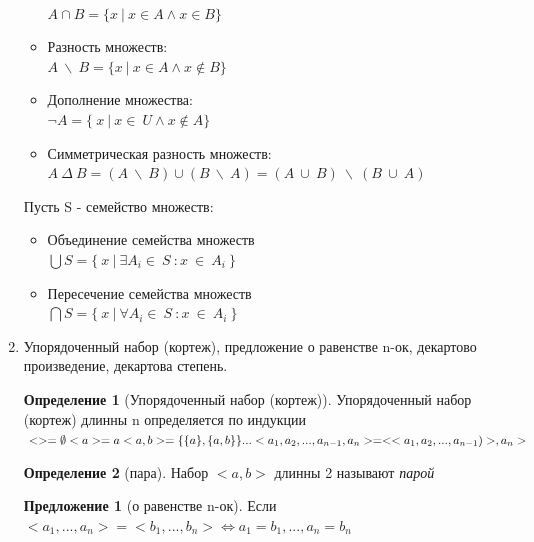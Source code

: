 \documentclass[a4paper]{article}
\theoremstyle{definition}
\newtheorem*{definition*}{Определение}
\newtheorem*{proposition*}{Предложение}
\begin{document}
\begin{enumerate}
\begin{itemize}
              \\ $A\cap{B} = \{ x \ | \ x \in{A} \land x\in{B}\}$
        \item Разность множеств:
              \\ $A \ \backslash\  B = \{x\ | \ x\in{A} \land x\notin{B} \}$
        \item Дополнение множества:
              \\ $\neg{A} = \{\ x\ |\ x \in{\ U} \land{x \notin{A}}\} $
        \item Симметрическая разность множеств:
              \\ $A \ \Delta \ B = (A \  \backslash \ B) \cup{(B \ \backslash{\ A})} = (A\ \cup{\ B })\ \backslash \ (B\ \cup{\ A } ) $
       \end{itemize}
       Пусть S - семейство множеств:
       \begin{itemize}
        \item Объединение семейства множеств\\
              $\bigcup{S} = \{\ x\ |\ \exists{A_i} \in{\ S \ }:x\ \in{\ A_i \ }\}$
        \item Пересечение семейства множеств\\
              $\bigcap{S} = \{\ x\ |\ \forall{A_i} \in{\ S\ }: x\ \in{\ A_i \ } \}$
       \end{itemize}
 \item Упорядоченный набор (кортеж), предложение о равенстве n-ок, декартово произведение, декартова степень.
       \begin{definition*}[Упорядоченный набор (кортеж)]
        Упорядоченный набор (кортеж) длинны n определяется по индукции
        \begin{math}\\
         <> = \emptyset\\
         <a> = a\\
         <a,b> = \{\{a\},\{a,b\}\}
         \\
         ...
         \\
         <a_1, a_2, ...,a_{n-1} ,a_n> = <<a_1, a_2, ...,a_{n-1})>, a_n>
        \end{math}
       \end{definition*}
       \begin{definition*}[пара]
        Набор $<a,b>$ длинны 2 называют \textit{парой}
       \end{definition*}
       \begin{proposition*}[о равенстве n-ок]
        Если \\ \mbox{$<a_1,...,a_n> = <b_1, ..., b_n> \Leftrightarrow a_1 = b_1, ..., a_n = b_n$}

\end{proposition*}
\end{enumerate}
\end{document}
